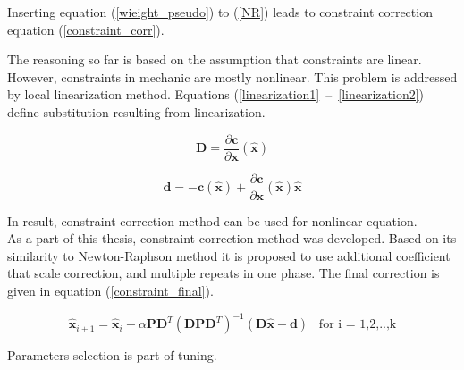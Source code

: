 Inserting equation (\ref{wieight_pseudo}) to (\ref{NR}) leads to constraint correction equation (\ref{constraint_corr}).

The reasoning so far is based on the assumption that constraints are linear. 
However, constraints in mechanic are mostly nonlinear. This problem is addressed by local linearization method. Equations \mbox{(\ref{linearization1} -- \ref{linearization2})} define substitution resulting from linearization.

\begin{equation}
	\bm{D} = \frac{\partial \bm{c}}{\partial \bm{x}}(\bm{\hat{x}})
	\label{linearization1}
\end{equation}

\begin{equation}
	\bm{d} =  - \bm{c} (\bm{\hat{x}}) +  \frac{\partial \bm{c}}{\partial \bm{x}}(\bm{\hat{x}}) \bm{\hat{x}}
	\label{linearization2}
\end{equation}

In result, constraint correction method can be used for nonlinear equation.\\ 

As a part of this thesis, constraint correction method was developed. Based on its similarity to Newton-Raphson method it is proposed to use additional coefficient that scale correction, and multiple repeats in one phase. The final correction is given in equation (\ref{constraint_final}).

\begin{equation}
	\bm{\hat{x}}_{i+1} = \bm{\hat{x}}_{i} - \alpha \bm{P} \bm{D}^T \left( \bm{D} \bm{P} \bm{D}^T \right)^{-1} \left( \bm{D} \bm{\hat{x}} - \bm{d}  \right) \hspace{10pt} \text{for i = 1,2,..,k}
	\label{constraint_final}
\end{equation}

 Parameters selection is part of tuning.  